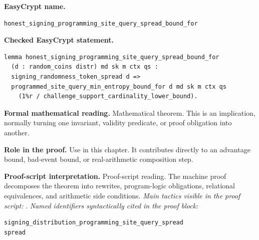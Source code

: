 \begin{formaltheorem}
\noindent\textbf{EasyCrypt name.}
\begin{lstlisting}[language=EasyCrypt,basicstyle=\ttfamily\scriptsize]
honest_signing_programming_site_query_spread_bound_for
\end{lstlisting}
\noindent\textbf{Checked EasyCrypt statement.}
\begin{lstlisting}[language=EasyCrypt,basicstyle=\ttfamily\scriptsize]
lemma honest_signing_programming_site_query_spread_bound_for
  (d : random_coins distr) md sk m ctx qs :
  signing_randomness_token_spread d =>
  programmed_site_query_min_entropy_bound_for d md sk m ctx qs
    (1%r / challenge_support_cardinality_lower_bound).
\end{lstlisting}
\noindent\textbf{Formal mathematical reading.}
Mathematical theorem. This is an implication, normally turning one invariant, validity predicate, or proof obligation into another.

\noindent\textbf{Role in the proof.}
Use in this chapter. It contributes directly to an advantage bound, bad-event bound, or real-arithmetic composition step.

\noindent\textbf{Proof-script interpretation.}
Proof-script reading. The machine proof decomposes the theorem into rewrites, program-logic obligations, relational equivalences, and arithmetic side conditions.
\emph{Main tactics visible in the proof script:} .
\emph{Named identifiers syntactically cited in the proof block:}
\begin{lstlisting}[language=EasyCrypt,basicstyle=\ttfamily\scriptsize]
signing_distribution_programming_site_query_spread
spread
\end{lstlisting}

\end{formaltheorem}

